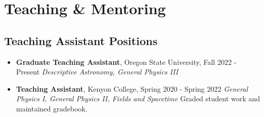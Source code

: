 \documentclass[11pt,letterpaper,sans,unicode]{moderncv}
\newcommand{\blucirc}{{\color{color1} $\circ\;\;$}}
\begin{document}
{%
%


\begin{etaremune}[leftmargin=8mm]

\end{etaremune}


%

\section{Teaching \& Mentoring}

\subsection{Teaching Assistant Positions}
	\renewcommand\labelitemi{\blucirc}
	\begin{itemize}[leftmargin=8mm]
	\setlength\itemsep{1mm}
	\item \textbf{\color{color1} Graduate Teaching Assistant}, Oregon State University, \hfill Fall 2022 - Present
        		\newline  \textit{Descriptive Astronomy, General Physics III }
	\item \textbf{\color{color1} Teaching Assistant}, Kenyon College, \hfill Spring 2020 - Spring 2022
        		\newline  \textit{General Physics I, General Physics II, Fields and Spacetime}
			\newline Graded student work and maintained gradebook.
	\end{itemize}

}
\end{document}
